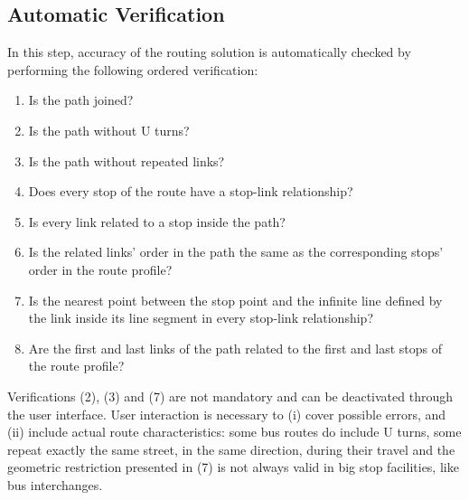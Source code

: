 \subsection{Automatic Verification}
In this step, accuracy of the routing solution is automatically checked by performing the following ordered verification:
%
\begin{enumerate}\styleEnumerate
\item Is the path joined?
\item Is the path without U turns?
\item Is the path without repeated links?
\item Does every stop of the route have a stop-link relationship?
\item Is every link related to a stop inside the path?
\item Is the related links' order in the path the same as the corresponding stops' order in the route profile?
\item Is the nearest point between the stop point and the infinite line defined by the link inside its line segment in every stop-link relationship?
\item Are the first and last links of the path related to the first and last  stops of the route profile?
\end{enumerate}

Verifications (2), (3) and (7) are not mandatory and can be deactivated through the user interface. User interaction is necessary to (i) cover possible errors, and (ii) include actual route characteristics: some bus routes do include U turns, some repeat exactly the same street, in the same direction, during their travel and the geometric restriction presented in (7) is not always valid in big stop facilities, like bus interchanges.


